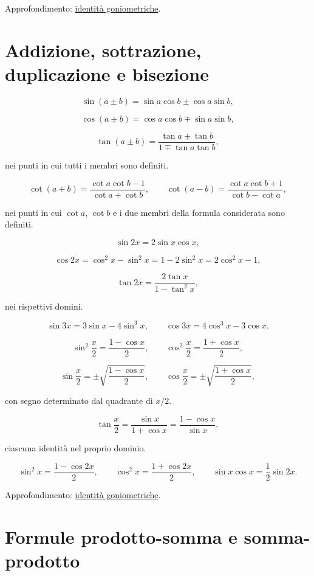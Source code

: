 Approfondimento: \href{https://ingegnerismo.it/matematica/identita-goniometriche/}{identità goniometriche}.

\section{Addizione, sottrazione, duplicazione e bisezione}\label{addizione-sottrazione-duplicazione-e-bisezione}

\[
\sin(a\pm b)=\sin a\cos b\pm\cos a\sin b,
\]

\[
\cos(a\pm b)=\cos a\cos b\mp\sin a\sin b,
\]

\[
\tan(a\pm b)=\frac{\tan a\pm\tan b}{1\mp\tan a\tan b},
\]

nei punti in cui tutti i membri sono definiti.

\[
\cot(a+b)=\frac{\cot a\cot b-1}{\cot a+\cot b},
\qquad
\cot(a-b)=\frac{\cot a\cot b+1}{\cot b-\cot a},
\]

nei punti in cui \(\cot a\), \(\cot b\) e i due membri della formula considerata sono definiti.

\[
\sin2x=2\sin x\cos x,
\]

\[
\cos2x=\cos^2x-\sin^2x=1-2\sin^2x=2\cos^2x-1,
\]

\[
\tan2x=\frac{2\tan x}{1-\tan^2x},
\]

nei rispettivi domini.

\[
\sin3x=3\sin x-4\sin^3x,
\qquad
\cos3x=4\cos^3x-3\cos x.
\]

\[
\sin^2\frac x2=\frac{1-\cos x}{2},
\qquad
\cos^2\frac x2=\frac{1+\cos x}{2},
\]

\[
\sin\frac x2=\pm\sqrt{\frac{1-\cos x}{2}},
\qquad
\cos\frac x2=\pm\sqrt{\frac{1+\cos x}{2}},
\]

con segno determinato dal quadrante di \(x/2\).

\[
\tan\frac x2
=\frac{\sin x}{1+\cos x}
=\frac{1-\cos x}{\sin x},
\]

ciascuna identità nel proprio dominio.

\[
\sin^2x=\frac{1-\cos2x}{2},
\qquad
\cos^2x=\frac{1+\cos2x}{2},
\qquad
\sin x\cos x=\frac12\sin2x.
\]

Approfondimento: \href{https://ingegnerismo.it/matematica/identita-goniometriche/}{identità goniometriche}.

\section{Formule prodotto-somma e somma-prodotto}\label{formule-prodotto-somma-e-somma-prodotto}

